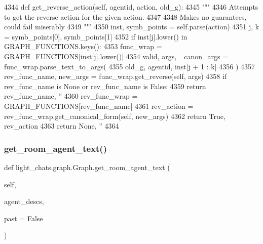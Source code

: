 \begin{DoxyCode}
4344     \textcolor{keyword}{def }get\_reverse\_action(self, agentid, action, old\_g):
4345         \textcolor{stringliteral}{"""}
4346 \textcolor{stringliteral}{        Attempts to get the reverse action for the given action.}
4347 \textcolor{stringliteral}{}
4348 \textcolor{stringliteral}{        Makes no guarantees, could fail miserably}
4349 \textcolor{stringliteral}{        """}
4350         inst, symb\_points = self.parse(action)
4351         j, k = symb\_points[0], symb\_points[1]
4352         \textcolor{keywordflow}{if} inst[j].lower() \textcolor{keywordflow}{in} GRAPH\_FUNCTIONS.keys():
4353             func\_wrap = GRAPH\_FUNCTIONS[inst[j].lower()]
4354             valid, args, \_canon\_args = func\_wrap.parse\_text\_to\_args(
4355                 old\_g, agentid, inst[j + 1 : k]
4356             )
4357             rev\_func\_name, new\_args = func\_wrap.get\_reverse(self, args)
4358             \textcolor{keywordflow}{if} rev\_func\_name \textcolor{keywordflow}{is} \textcolor{keywordtype}{None} \textcolor{keywordflow}{or} rev\_func\_name \textcolor{keywordflow}{is} \textcolor{keyword}{False}:
4359                 \textcolor{keywordflow}{return} rev\_func\_name, \textcolor{stringliteral}{''}
4360             rev\_func\_wrap = GRAPH\_FUNCTIONS[rev\_func\_name]
4361             rev\_action = rev\_func\_wrap.get\_canonical\_form(self, new\_args)
4362             \textcolor{keywordflow}{return} \textcolor{keyword}{True}, rev\_action
4363         \textcolor{keywordflow}{return} \textcolor{keywordtype}{None}, \textcolor{stringliteral}{''}
4364 
\end{DoxyCode}
\mbox{\label{classlight__chats_1_1graph_1_1Graph_abe32388ae807a26036573890d1293e2a}} 
\subsubsection{\texorpdfstring{get\+\_\+room\+\_\+agent\+\_\+text()}{get\_room\_agent\_text()}}
{\footnotesize\ttfamily def light\+\_\+chats.\+graph.\+Graph.\+get\+\_\+room\+\_\+agent\+\_\+text (\begin{DoxyParamCaption}\item[{}]{self,  }\item[{}]{agent\+\_\+descs,  }\item[{}]{past = {\ttfamily False} }\end{DoxyParamCaption})}

